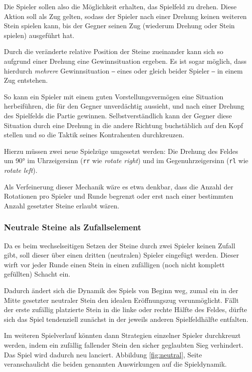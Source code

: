 \documentclass[a4paper,11pt,hidelinks]{scrartcl}
\newcommand{\imgref}[1]{{Abbildung \ref{#1}, Seite \pageref{#1}}}
\begin{document}
Die Spieler sollen also die Möglichkeit erhalten, das Spielfeld zu drehen. Diese Aktion soll als Zug gelten, sodass der Spieler nach einer Drehung keinen weiteren Stein spielen kann, bis der Gegner seinen Zug (wiederum Drehung oder Stein spielen) ausgeführt hat.

Durch die veränderte relative Position der Steine zueinander kann sich so aufgrund einer Drehung eine Gewinnsituation ergeben. Es ist sogar möglich, dass hierdurch \textit{mehrere} Gewinnsituation ‒ eines oder gleich beider Spieler ‒ in einem Zug entstehen.

So kann ein Spieler mit einem guten Vorstellungsvermögen eine Situation herbeiführen, die für den Gegner unverdächtig aussieht, und nach einer Drehung des Spielfelds die Partie gewinnen. Selbstverständlich kann der Gegner diese Situation durch eine Drehung in die andere Richtung buchstäblich auf den Kopf stellen und so die Taktik seines Kontrahenten durchkreuzen.

Hierzu müssen zwei neue Spielzüge umgesetzt werden: Die Drehung des Feldes um 90° im Uhrzeigersinn (\texttt{rr} wie \textit{rotate right}) und im Gegenuhrzeigersinn (\texttt{rl} wie \textit{rotate left}).

Als Verfeinerung dieser Mechanik wäre es etwa denkbar, dass die Anzahl der Rotationen pro Spieler und Runde begrenzt oder erst nach einer bestimmten Anzahl gesetzter Steine erlaubt wären.

\subsubsection{Neutrale Steine als Zufallselement}

Da es beim wechselseitigen Setzen der Steine durch zwei Spieler keinen Zufall gibt, soll dieser über einen dritten (neutralen) Spieler eingefügt werden. Dieser wirft vor jeder Runde einen Stein in einen zufälligen (noch nicht komplett gefüllten) Schacht ein.

Dadurch ändert sich die Dynamik des Spiels von Beginn weg, zumal ein in der Mitte gesetzter neutraler Stein den idealen Eröffnungszug verunmöglicht. Fällt der erste zufällig platzierte Stein in die linke oder rechte Hälfte des Feldes, dürfte sich das Spiel tendenziell zunächst in der jeweils anderen Spielfeldhälfte entfalten.

Im weiteren Spielverlauf könnten dann Strategien einzelner Spieler durchkreuzt werden, indem ein zufällig fallender Stein den sicher geglaubten Sieg verhindert. Das Spiel wird dadurch neu lanciert. \imgref{fig:neutral} veranschaulicht die beiden genannten Auswirkungen auf die Spieldynamik.
\end{document}
